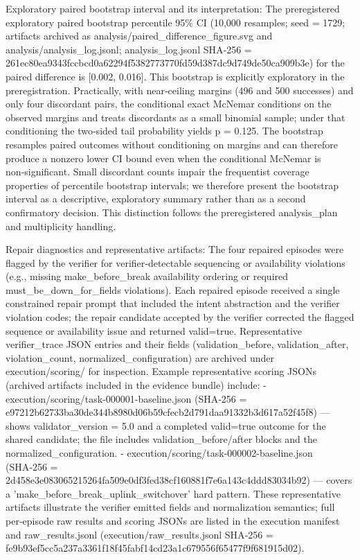 \documentclass[conference]{IEEEtran}
\begin{document}
Exploratory paired bootstrap interval and its interpretation: The preregistered exploratory paired bootstrap percentile 95\% CI (10,000 resamples; seed = 1729; artifacts archived as analysis/paired\_difference\_figure.svg and analysis/analysis\_log.jsonl; analysis\_log.jsonl SHA‑256 = 261ec80e\allowbreak{}a9343fcc\allowbreak{}bcd0a622\allowbreak{}94f53827\allowbreak{}73770fd5\allowbreak{}9d387dc9\allowbreak{}d749de50\allowbreak{}ca909b3e) for the paired difference is [0.002, 0.016]. This bootstrap is explicitly exploratory in the preregistration. Practically, with near‑ceiling margins (496 and 500 successes) and only four discordant pairs, the conditional exact McNemar conditions on the observed margins and treats discordants as a small binomial sample; under that conditioning the two‑sided tail probability yields p = 0.125. The bootstrap resamples paired outcomes without conditioning on margins and can therefore produce a nonzero lower CI bound even when the conditional McNemar is non‑significant. Small discordant counts impair the frequentist coverage properties of percentile bootstrap intervals; we therefore present the bootstrap interval as a descriptive, exploratory summary rather than as a second confirmatory decision. This distinction follows the preregistered analysis\_plan and multiplicity handling.

Repair diagnostics and representative artifacts: The four repaired episodes were flagged by the verifier for verifier‑detectable sequencing or availability violations (e.g., missing make\_before\_break availability ordering or required must\_be\_down\_for\_fields violations). Each repaired episode received a single constrained repair prompt that included the intent abstraction and the verifier violation codes; the repair candidate accepted by the verifier corrected the flagged sequence or availability issue and returned valid=true. Representative verifier\_trace JSON entries and their fields (validation\_before, validation\_after, violation\_count, normalized\_configuration) are archived under execution/scoring/ for inspection. Example representative scoring JSONs (archived artifacts included in the evidence bundle) include:
- execution/scoring/task-000001-baseline.json (SHA‑256 = e97212b6\allowbreak{}2733ba30\allowbreak{}de344b89\allowbreak{}80d06b59\allowbreak{}cfecb2d7\allowbreak{}91daa913\allowbreak{}32b3d617\allowbreak{}a52f45f8) --- shows validator\_version = 5.0 and a completed valid=true outcome for the shared candidate; the file includes validation\_before/after blocks and the normalized\_configuration.
- execution/scoring/task-000002-baseline.json (SHA‑256 = 2d458e3e\allowbreak{}08306521\allowbreak{}5264fa50\allowbreak{}9e0df3fe\allowbreak{}d38cf160\allowbreak{}881f7e6a\allowbreak{}143c4ddd\allowbreak{}83034b92) --- covers a 'make\_before\_break\_uplink\_switchover' hard pattern.
These representative artifacts illustrate the verifier emitted fields and normalization semantics; full per‑episode raw results and scoring JSONs are listed in the execution manifest and raw\_results.jsonl (execution/raw\_results.jsonl SHA‑256 = fe9b93ef\allowbreak{}5cc5a237\allowbreak{}a3361f18\allowbreak{}f45fabf1\allowbreak{}4cd23a1c\allowbreak{}679556f6\allowbreak{}5477f9f6\allowbreak{}81915d02).
\end{document}

